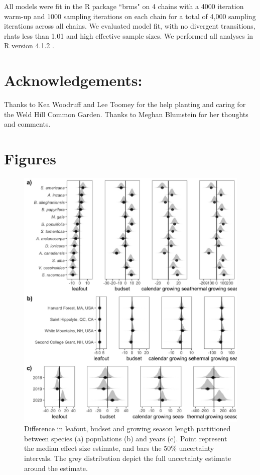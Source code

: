 \documentclass{article}[12pt]
\begin{document}
{All models were fit in the R package ``brms" \citep{Burkner2018} on 4 chains with a 4000 iteration warm-up and 1000 sampling iterations on each chain for a total of 4,000 sampling iterations across all chains. We evaluated model fit, with no divergent transitions, rhats less than 1.01 and high effective sample sizes. We performed all analyses in R version 4.1.2 \citep{R2021}.

\section{Acknowledgements:}
Thanks to Kea Woodruff and Lee Toomey for the help planting and caring for the Weld Hill Common Garden. Thanks to Meghan Blumstein for her thoughts and comments.

\newpage
\section{Figures} 

\begin{figure}[h!]
    \centering
 \includegraphics[width=.7\textwidth]{..//analyses/figures/var_parts.jpeg}
    \caption{Difference in leafout, budset and growing season length partitioned between species (a) populations (b) and years (c). Point represent the median effect size estimate, and bars the 50\% uncertainty intervals. The grey distribution depict the full uncertainty estimate around the estimate.}
    \label{fig:vapar}
\end{figure}

}
\end{document}
